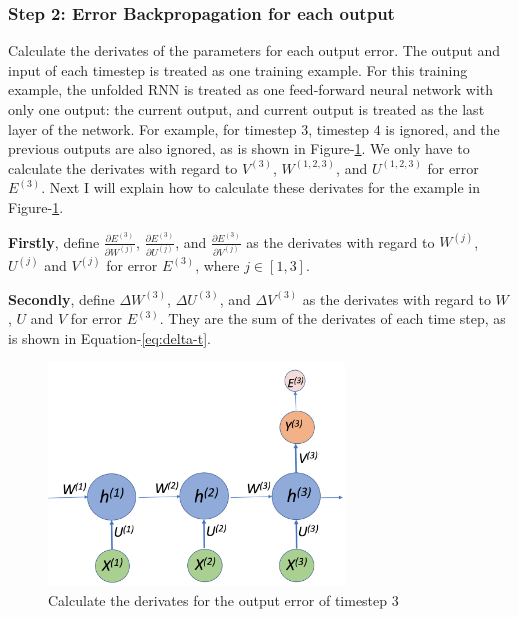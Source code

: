 \documentclass[english]{article}
\begin{document}
\subsubsection{Step 2: Error Backpropagation for each output}\label{sec:bptt}
Calculate the derivates of the parameters for each output error. The output and input of each timestep is treated as one training example. For this training example, the unfolded RNN is treated as one feed-forward neural network with only one output: the current output, and current output is treated as the last layer of the network.  For example, for timestep $3$, timestep $4$  is ignored, and the previous outputs are also ignored, as is shown in Figure-\ref{fig:step_error}. We only have to calculate the derivates with regard to $V^{(3)}$,  $W^{(1,2,3)}$, and $U^{(1,2,3)}$ for error $E^{(3)}$. Next I will explain how to calculate these derivates for the example in Figure-\ref{fig:step_error}.

\textbf{Firstly}, define $\frac{\partial E^{(3)}}{\partial W^{(j)}}$,  $\frac{\partial E^{(3)}}{\partial U^{(j)}}$, and $\frac{\partial E^{(3)}}{\partial V^{(j)}}$ as the derivates with regard to $W^{(j)}$, $U^{(j)}$ and $V^{(j)}$ for error $E^{(3)}$, where $j \in [1,3]$.

\textbf{Secondly}, define $\Delta W^{(3)}$,  $\Delta U^{(3)}$, and $\Delta V^{(3)}$ 
as the derivates with regard to $W$, $U$ and $V$ for error $E^{(3)}$. They are the sum of the derivates of each time step, as is shown in Equation-\ref{eq:delta-t}.

\begin{figure}[htbp]
	\centering
	\includegraphics[width=0.7\textwidth]{rnn-example}
	\caption{Calculate the derivates for the output error of timestep 3}
	\label{fig:step_error}
\end{figure}
\end{document}
